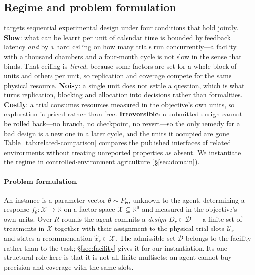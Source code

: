 \section{\slowlab}
\label{sec:regime}
\label{sec:env}

\subsection{Regime and problem formulation}
\label{sec:conditions}
\label{sec:formulation}

\slowlab{} targets sequential experimental design under four conditions that hold jointly.
\textbf{Slow}: what can be learnt per unit of calendar time is bounded by feedback latency
\emph{and} by a hard ceiling on how many trials run concurrently---a facility with a
thousand chambers and a four-month cycle is not slow in the sense that binds. That ceiling
is \emph{tiered}, because some factors are set for a whole block of units and others per
unit, so replication and coverage compete for the same physical resource.
\textbf{Noisy}: a single unit does not settle a question, which is what turns replication,
blocking and allocation into decisions rather than formalities. \textbf{Costly}: a trial
consumes resources measured in the objective's own units, so exploration is priced rather
than free. \textbf{Irreversible}: a submitted design cannot be rolled back---no branch, no
checkpoint, no revert---so the only remedy for a bad design is a new one in a later cycle,
and the units it occupied are gone. Table~\ref{tab:related-comparison} compares the
published interfaces of related environments without treating unreported properties as
absent. We instantiate the regime in controlled-environment agriculture
(\S\ref{sec:domain}).

\paragraph{Problem formulation.} An instance is a parameter vector $\theta \sim P_\Theta$,
unknown to the agent, determining a response $f_\theta : \mathcal{X} \to \mathbb{R}$ on a
factor space $\mathcal{X} \subseteq \mathbb{R}^{d}$ and measured in the objective's own
units. Over $R$ rounds the agent commits a \emph{design} $D_r \in \mathcal{D}$ --- a finite
set of treatments in $\mathcal{X}$ together with their assignment to the physical trial
slots $\mathcal{U}_r$ --- and states a recommendation $\hat{x}_r \in \mathcal{X}$. The
admissible set $\mathcal{D}$ belongs to the facility rather than to the task;
\S\ref{sec:facility} gives it for our instantiation. Its one structural role here is that it
is not all finite multisets: an agent cannot buy precision and coverage with the same slots.

